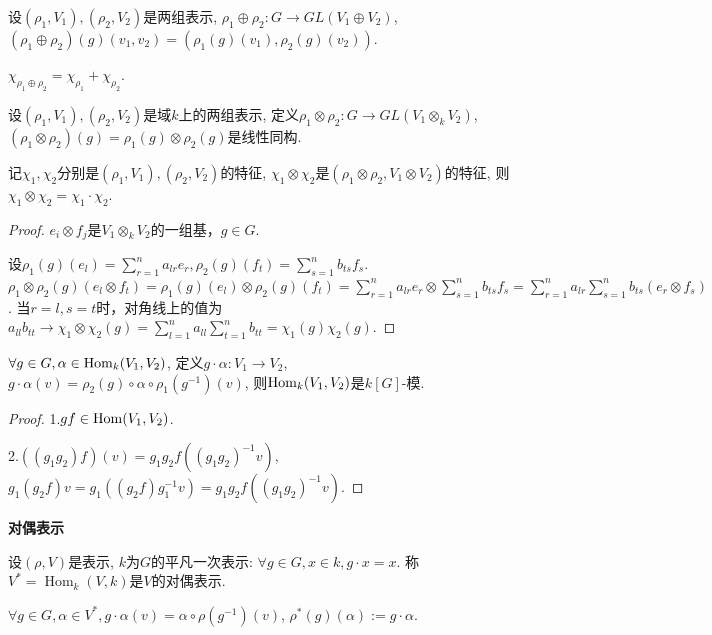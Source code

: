 \begin{definition}
    设$(\rho_1,V_1),(\rho_2,V_2)$是两组表示, 
    $\rho_1\oplus \rho_2:G\rightarrow GL(V_1\oplus V_2)$, 
    $(\rho_1\oplus \rho_2)(g)(v_1,v_2)=(\rho_1(g)(v_1),\rho_2(g)(v_2))$. 
\end{definition}

\begin{proposition}
    $\chi_{\rho_1\oplus \rho_2}=\chi_{\rho_1}+\chi_{\rho_2}.$
\end{proposition}

\begin{definition}
    设$(\rho_1,V_1),(\rho_2,V_2)$是域$k$上的两组表示, 
    定义$\rho_1\otimes \rho_2:G\rightarrow GL(V_1\otimes_k V_2)$, 
    $(\rho_1\otimes \rho_2)(g)=\rho_1(g)\otimes \rho_2(g)$是线性同构.
\end{definition}

\begin{proposition}
    记$\chi_1, \chi_2$分别是$(\rho_1,V_1),(\rho_2,V_2)$的特征, 
    $\chi_1\otimes\chi_2$是$(\rho_1\otimes\rho_2, V_1\otimes V_2)$的特征, 
    则$\chi_1\otimes \chi_2=\chi_1\cdot \chi_2$.
\end{proposition}
\begin{proof}
	$e_i\otimes f_j$是$V_1\otimes_k V_2$的一组基，$g \in G$.
	
	设$\rho_1(g)(e_l)=\sum_{r=1}^{n}a_{lr}e_r,\rho_2(g)(f_t)
    =\sum_{s=1}^{n}b_{ts}f_s$.$\rho_1\otimes \rho_2(g)(e_l\otimes f_t)
    =\rho _1(g)(e_l)\otimes\rho_2(g)(f_t)
    =\sum_{r=1}^{n} a_{lr}e_r\otimes \sum_{s=1}^{n} b_{ts}f_s
    =\sum_{r=1}^{n} a_{lr}\sum_{s=1}^{n} b_{ts} (e_r\otimes f_s)$.
    当$r=l,s=t$时，对角线上的值为$a_{ll}b_{tt}
    \rightarrow \chi_{1}\otimes \chi_2 (g)
    =\sum_{l=1}^{n} a_{ll}\sum_{t=1}^{n} b_{tt}=\chi_1 (g)\chi_2(g).$
\end{proof}
\begin{definition}
    $\forall g\in G, \alpha \in \operatorname{Hom}_k(V_1,V_2)$, 
    定义$g\cdot \alpha:V_1\rightarrow V_2$, 
    $g\cdot \alpha(v)=\rho_2(g)\circ \alpha\circ \rho_1(g^{-1})(v)$, 
    则$\operatorname{Hom}_k(V_1,V_2)$是$k[G]$-模.
\end{definition}
\begin{proof}
	1.$gf \in \operatorname{Hom}(V_1,V_2)$.
	
	2.$((g_1g_2)f)(v)=g_1g_2f((g_1g_2)^{-1}v)$,
    $g_1(g_2f)v=g_1((g_2f)g_1^{-1}v)=g_1g_2f((g_1g_2)^{-1}v).$
\end{proof}
\begin{definition} \textbf{对偶表示}\par
    \qquad 设$(\rho,V)$是表示, $k$为$G$的平凡一次表示: 
    $\forall g\in G, x\in k, g\cdot x=x$. 
    称$V^*=\operatorname{Hom}_k(V,k)$是$V$的对偶表示.\par
    \qquad $\forall g\in G, \alpha\in V^*, g\cdot \alpha(v)
    =\alpha\circ \rho(g^{-1})(v)$, $\rho^*(g)(\alpha):=g\cdot \alpha$.
\end{definition}

